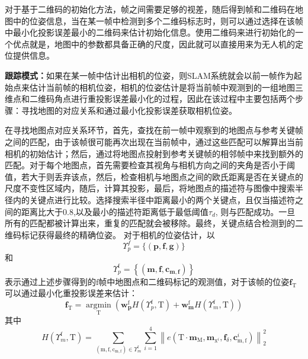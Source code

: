 对于基于二维码的初始化方法，帧之间需要足够的视差，随后得到帧和二维码在地图中的位姿信息，当在某一帧中检测到多个二维码标志时，则可以通过选择在该帧中最小化投影误差最小的二维码来估计初始化信息。使用二维码来进行初始化的一个优点就是，地图中的参数都具备正确的尺度，因此就可以直接用来为无人机的定位提供信息。

\textbf{跟踪模式：}如果在某一帧中估计出相机的位姿，则SLAM系统就会以前一帧作为起始点来估计当前帧的相机位姿，相机的位姿估计是将当前帧中观测到的一组地图三维点和二维码角点进行重投影误差最小化的过程，因此在该过程中主要包括两个步骤：寻找地图的对应关系和通过最小化投影误差获取相机位姿。

在寻找地图点对应关系环节，首先，查找在前一帧中观察到的地图点与参考关键帧之间的匹配，由于该帧很可能再次出现在当前帧中，通过这些匹配可以解算出当前相机的初始估计；然后，通过将地图点投射到参考关键帧的相邻帧中来找到额外的匹配。对于每个地图点，首先需要检查其视角与相机方向之间的夹角是否小于阈值，若大于则丢弃该点，然后，检查相机与地图点之间的欧氏距离是否在关键点的尺度不变性区域内，随后，计算其投影，最后，将地图点的描述符与图像中搜索半径内的关键点进行比较。选择搜索半径中距离最小的两个关键点，且仅当描述符之间的距离比大于0.8,以及最小的描述符距离低于最低阈值$\tau_d$, 则与匹配成功。一旦所有的匹配都被计算出来，重复的匹配就会被移除。最终，关键点结合检测到的二维码标记获得最终的精确位姿。
对于相机的位姿估计，以
\begin{equation}
\Upsilon_{p}^{f}=\{(\mathbf{p}, \mathbf{f}, \mathbf{g})\}
\end{equation}
和
\begin{equation}
\Upsilon_{p}^{\mathrm{f}}=\left\{\left(\mathbf{m}, \mathbf{f}, \mathbf{c}_{\mathbf{m}, \mathbf{f}}\right)\right\}
\end{equation}
表示通过上述步骤得到的$\mathrm{f}$帧中地图点和二维码标记的观测值，对于该帧的位姿$\mathbf{f}_{\mathrm{T}}$可以通过最小化重投影误差来估计：
\begin{equation}
\mathbf{f}_{\mathrm{T}}=\underset{\mathrm{T}}{\operatorname{argmin}}\left(\mathbf{w}_{\mathbf{p}}^{\mathrm{f}} H\left(\Upsilon_{p}^{\mathrm{f}}, \mathrm{T}\right)+\mathbf{w}_{\mathbf{m}}^{\mathrm{f}} H\left(\Upsilon_{m}^{\mathrm{f}}, \mathrm{T}\right)\right)
\label{equ:weight}
\end{equation}
其中
\begin{equation}
H\left(\Upsilon_{m}^{\mathrm{f}}, \mathrm{T}\right)=\sum_{\left(\mathrm{m}, \mathrm{f}, \mathrm{c}_{\mathrm{m}, \mathrm{f}}\right) \in \Upsilon_{m}^{\mathrm{f}}} \sum_{i=1}^{4}\left\|e\left(\mathrm{T} \cdot \mathbf{m}_{\mathrm{M}}, \mathbf{m}_{\mathrm{x}^{i}}, \mathbf{f}_{\delta}, \mathbf{c}_{\mathrm{m}, \mathrm{f}}^{i}\right)\right\|_{2}^{2}
\end{equation}
